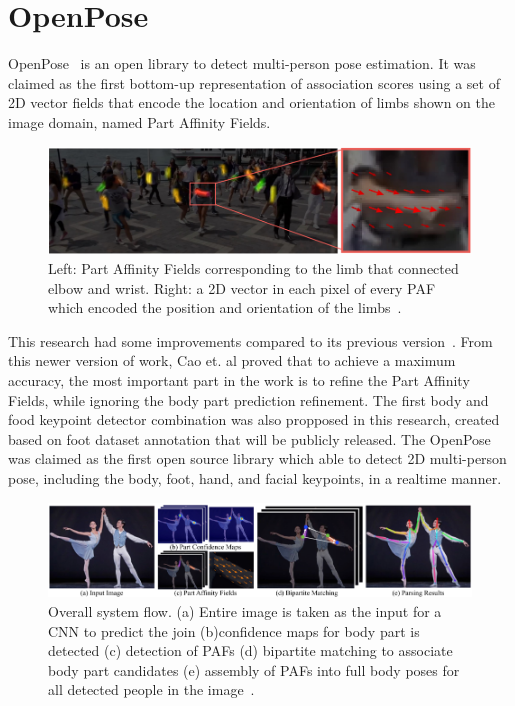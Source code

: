 \section{OpenPose}
\label{sec:4_openpose}
OpenPose~\cite{cao2018openpose} is an open library to detect multi-person pose estimation. It was claimed as the first bottom-up representation of association scores using a set of 2D vector fields that encode the location and orientation of limbs shown on the image domain, named Part Affinity Fields.

\begin{figure}[H]
	\begin{center}
		\includegraphics[width=1.0\textwidth]{figures/paf.png}
		\caption{Left: Part Affinity Fields corresponding to the limb that connected elbow and wrist. Right: a 2D vector in each pixel of every PAF which encoded the position and orientation of the limbs~\cite{cao2018openpose}.} 
		\label{fig:3_OpenPose}
	\end{center}
\end{figure}

This research had some improvements compared to its previous version~\cite{cao2017realtime}. From this newer version of work, Cao et. al proved that to achieve a maximum accuracy, the most important part in the work is to refine the Part Affinity Fields, while ignoring the body part prediction refinement. The first body and food keypoint detector combination was also propposed in this research, created based on foot dataset annotation that will be publicly released. The OpenPose was claimed as the first open source library which able to detect 2D multi-person pose, including the body, foot, hand, and facial keypoints, in a realtime manner.

\begin{figure}[H]
	\begin{center}
		\includegraphics[width=1.0\textwidth]{figures/openposesystem.png}
		\caption{Overall system flow. (a) Entire image is taken as the input for a CNN to predict the join (b)confidence maps for body part is detected (c) detection of PAFs (d) bipartite matching to associate body part candidates (e) assembly of PAFs into full body poses for all detected people in the image~\cite{cao2018openpose}.} 
		\label{fig:4_OpenPoseFlow}
	\end{center}
\end{figure}


